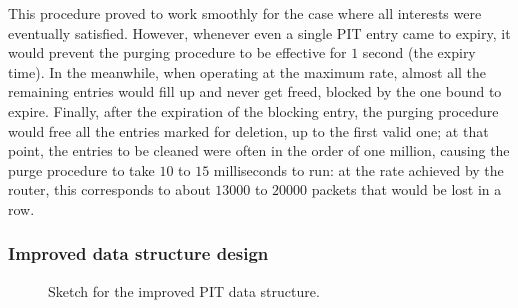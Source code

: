\documentclass[11pt,a4paper,twoside,titlepage,openany]{book}
\begin{document}
This procedure proved to work smoothly for the case where all interests were eventually satisfied. However, whenever even a single PIT entry came to expiry, it would prevent the purging procedure to be effective for $1$ second (the expiry time). In the meanwhile, when operating at the maximum rate, almost all the remaining entries would fill up and never get freed, blocked by the one bound to expire. Finally, after the expiration of the blocking entry, the purging procedure would free all the entries marked for deletion, up to the first valid one; at that point, the entries to be cleaned were often in the order of one million, causing the purge procedure to take $10$ to $15$ milliseconds to run: at the rate achieved by the router, this corresponds to about $13000$ to $20000$ packets that would be lost in a row.

\subsubsection{Improved data structure design}\label{sec:augustus.pit.new}

\begin{figure}[tb]
  \begin{center}
    \caption[Sketch for the improved PIT data structure]{Sketch for the improved PIT data structure.}
    \label{fig:augustus.newpit}
  \end{center}
\end{figure}
\end{document}
